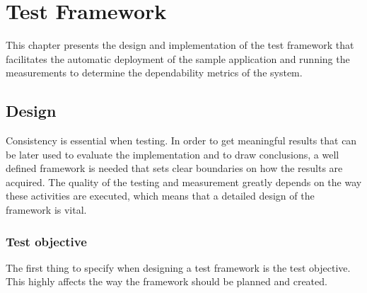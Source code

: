 \chapter{Test Framework}

This chapter presents the design and implementation of the test framework that facilitates the automatic deployment of the sample application and running the measurements to determine the dependability metrics of the system.

\section{Design}

Consistency is essential when testing. In order to get meaningful results that can be later used to evaluate the implementation and to draw conclusions, a well defined framework is needed that sets clear boundaries on how the results are acquired. The quality of the testing and measurement greatly depends on the way these activities are executed, which means that a detailed design of the framework is vital.

%	

\subsection{Test objective}

The first thing to specify when designing a test framework is the test objective. This highly affects the way the framework should be planned and created.


